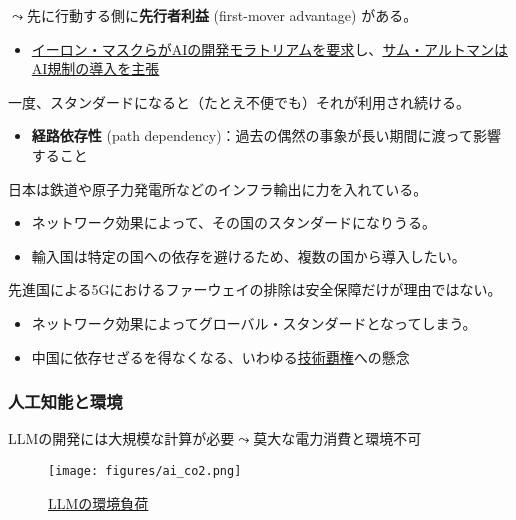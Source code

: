 \documentclass[
  xelatex,
  ja=standard]{bxjsarticle}
\providecommand{\tightlist}{%
  \setlength{\itemsep}{0pt}\setlength{\parskip}{0pt}}\usepackage{longtable,booktabs,array}
\begin{document}
\(\leadsto\)先に行動する側に\textbf{先行者利益} (first-mover advantage)
がある。

\begin{itemize}
\tightlist
\item
  \href{https://jp.reuters.com/article/elon-musk-ai-idJPKBN2VV0CW}{イーロン・マスクらがAIの開発モラトリアムを要求}し、\href{https://www.bloomberg.co.jp/news/articles/2023-05-16/RUREP2T0G1KW01}{サム・アルトマンはAI規制の導入を主張}
\end{itemize}

一度、スタンダードになると（たとえ不便でも）それが利用され続ける。

\begin{itemize}
\tightlist
\item
  \textbf{経路依存性} (path
  dependency)：過去の偶然の事象が長い期間に渡って影響すること
\end{itemize}

日本は鉄道や原子力発電所などのインフラ輸出に力を入れている。

\begin{itemize}
\tightlist
\item
  ネットワーク効果によって、その国のスタンダードになりうる。
\item
  輸入国は特定の国への依存を避けるため、複数の国から導入したい。
\end{itemize}

先進国による5Gにおけるファーウェイの排除は安全保障だけが理由ではない。

\begin{itemize}
\tightlist
\item
  ネットワーク効果によってグローバル・スタンダードとなってしまう。
\item
  中国に依存せざるを得なくなる、いわゆる\href{https://www.jiia.or.jp/column/post-30.html}{技術覇権}への懸念
\end{itemize}

\hypertarget{ux4ebaux5de5ux77e5ux80fdux3068ux74b0ux5883}{%
\subsubsection{人工知能と環境}\label{ux4ebaux5de5ux77e5ux80fdux3068ux74b0ux5883}}

LLMの開発には大規模な計算が必要\(\leadsto\)莫大な電力消費と環境不可

\begin{figure}[htpb]

{\centering \texttt{[image: figures/ai\_co2.png]}

}

\caption{\href{https://www.gizmodo.jp/2023/04/chatgpt-ai-openai-carbon-emissions-stanford-report.html}{LLMの環境負荷}}

\end{figure}
\end{document}
